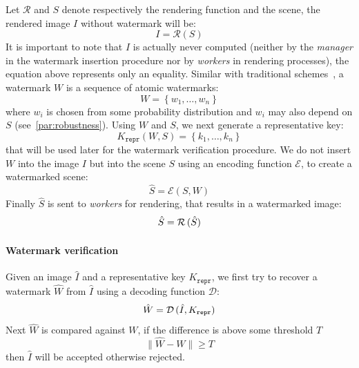 Let $\mathcal{R}$ and $S$ denote respectively the rendering function and the scene, the rendered image $I$ without watermark will be:
\begin{equation*}
    I = \mathcal{R} \left( S \right)
\end{equation*}
It is important to note that $I$ is actually never computed (neither by the \emph{manager} in the watermark insertion procedure nor by \emph{workers} in rendering processes), the equation above represents only an equality. Similar with traditional schemes~\cite{Cox1999,Cox1997,Craver1997}, a watermark $W$ is a sequence of atomic watermarks:
\begin{equation*}
    W = \left\{ w_1,\dots,w_n \right\}
\end{equation*}
where $w_i$ is chosen from some probability distribution and $w_i$ may also depend on $S$ (see~\autoref{par:robustness}). Using $W$ and $S$, we next generate a representative key:
\begin{equation*}
    K_{\mathtt{repr}} \left(W,S\right) = \left\{ k_1,\dots,k_n \right\}
\end{equation*}
that will be used later for the watermark verification procedure. We do not insert $W$ into the image $I$ but into the scene $S$ using an encoding function $\mathcal{E}$, to create a watermarked scene:
\begin{equation*}
    \hat{S} = \mathcal{E} \left(S, W\right)
\end{equation*}
Finally $\hat{S}$ is sent to \emph{workers} for rendering, that results in a watermarked image:
\begin{equation*}
    \hat{S} = \mathcal{R} \thinspace (\hat{S})
\end{equation*}

\paragraph[Watermark verification]{Watermark verification}
Given an image $\hat{I}$ and a representative key $K_{\mathtt{repr}}$, we first try to recover a watermark $\hat{W}$ from $\hat{I}$ using a decoding function $\mathcal{D}$:
\begin{equation*}
    \hat{W} = \mathcal{D} \thinspace (\hat{I}, K_{\mathtt{repr}})
\end{equation*}
Next $\hat{W}$ is compared against $W$, if the difference is above some threshold $T$
\begin{equation*}
    \lVert \hat{W} - W \rVert \geq T
\end{equation*}
then $\hat{I}$ will be accepted otherwise rejected.

